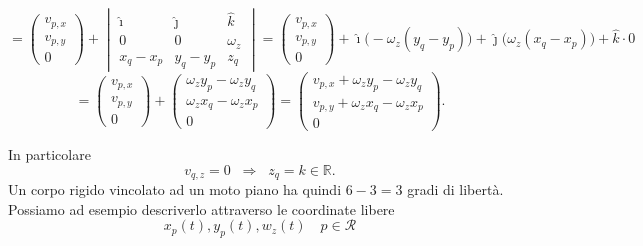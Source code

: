 \[
=
\begin{pmatrix}
v_{p,x}\\
v_{p,y}\\
0
\end{pmatrix}
+
\begin{vmatrix}
\hat{\imath} & \hat{\jmath} & \hat{k}\\
0 & 0 & \omega_z\\
x_q-x_p & y_q-y_p & z_q
\end{vmatrix}
=
\begin{pmatrix}
v_{p,x}\\
v_{p,y}\\
0
\end{pmatrix}
+\hat{\imath}\bigl(-\omega_z(y_q-y_p)\bigr)
+\hat{\jmath}\bigl(\omega_z(x_q-x_p)\bigr)
+\hat{k}\cdot 0
\]
\[
=
\begin{pmatrix}
v_{p,x}\\
v_{p,y}\\
0
\end{pmatrix}
+
\begin{pmatrix}
\omega_z y_p-\omega_z y_q\\
\omega_z x_q-\omega_z x_p\\
0
\end{pmatrix}
=
\begin{pmatrix}
v_{p,x}+\omega_z y_p-\omega_z y_q\\
v_{p,y}+\omega_z x_q-\omega_z x_p\\
0
\end{pmatrix}.
\]

In particolare
\[
v_{q,z}=0 \;\;\Rightarrow\;\; z_q=k\in\mathbb{R}.
\]
Un corpo rigido vincolato ad un moto piano ha quindi $6-3=3$ gradi di libertà.\\
Possiamo ad esempio descriverlo attraverso le coordinate libere
\[
x_{p}(t) , y_{p}(t) , w_z(t)  \quad p \in \mathcal{R}
\]

